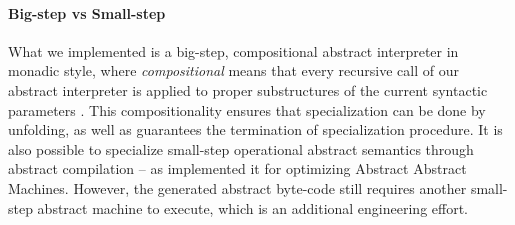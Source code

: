 \paragraph{Big-step vs Small-step}

What we implemented is a big-step, compositional abstract interpreter in monadic
style, where \textit{compositional} means that every recursive call of our abstract
interpreter is applied to proper substructures of the current syntactic
parameters \cite{10.1007/3-540-61580-6_11}. This compositionality ensures that
specialization can be done by unfolding, as well as guarantees the termination
of specialization procedure. It is also possible to specialize small-step
operational abstract semantics through abstract compilation
\cite{Boucher:1996:ACN:647473.727587} -- as
\citet{Johnson:2013:OAA:2500365.2500604} implemented it for
optimizing Abstract Abstract Machines. However, the generated abstract
byte-code still requires another small-step abstract machine to execute, which is
an additional engineering effort.

